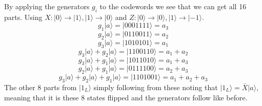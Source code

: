 \documentclass[12pt]{article}
\newcommand{\ket}[1]{\vert{#1}\rangle}
\begin{document}
\begin{enumerate}
    By applying the generators $g_i$ to the codewords we see that we can get all 16 parts. Using $X: \ket{0} \rightarrow \ket{1}, \ket{1} \rightarrow \ket{0}$ and $Z: \ket{0} \rightarrow \ket{0}, \ket{1} \rightarrow \ket{-1}$.
    $$ g_1 \ket{a} = \ket{0001111} = a_3 $$
    $$ g_2 \ket{a} = \ket{0110011} = a_2 $$
    $$ g_3 \ket{a} = \ket{1010101} = a_1 $$
    $$ g_3 \ket{a} + g_2 \ket{a} = \ket{1100110} = a_1 + a_2 $$
    $$ g_3 \ket{a} + g_1 \ket{a} = \ket{1011010} = a_1 + a_3 $$
    $$ g_2 \ket{a} + g_1 \ket{a} = \ket{0111100} = a_2 + a_3 $$
    $$ g_3 \ket{a} + g_2 \ket{a} + g_1 \ket{a} = \ket{1101001} = a_1 + a_2 + a_3 $$
    The other 8 parts from $\ket{1_L}$ simply following from these noting that $\ket{1_L} = \bar{X} \ket{a}$, meaning that it is these 8 states flipped and the generators follow like before. 
\end{enumerate}
\end{document}

